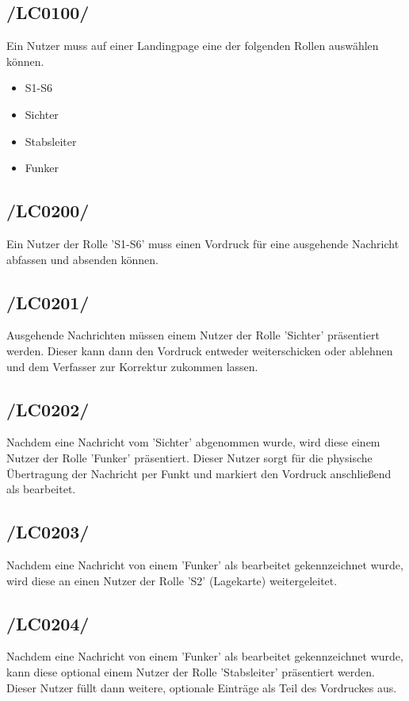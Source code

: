 \subsection{/LC0100/}
Ein Nutzer muss auf einer Landingpage eine der folgenden Rollen auswählen können.
\begin{itemize}
\item S1-S6
\item Sichter
\item Stabsleiter
\item Funker
\end{itemize}

\subsection{/LC0200/}
Ein Nutzer der Rolle 'S1-S6' muss einen Vordruck für eine ausgehende Nachricht abfassen und absenden können.

\subsection{/LC0201/}
Ausgehende Nachrichten müssen einem Nutzer der Rolle 'Sichter' präsentiert werden. Dieser kann dann den Vordruck entweder weiterschicken oder ablehnen und dem Verfasser zur Korrektur zukommen lassen.

\subsection{/LC0202/}
Nachdem eine Nachricht vom 'Sichter' abgenommen wurde, wird diese einem Nutzer der Rolle 'Funker' präsentiert. Dieser Nutzer sorgt für die physische Übertragung der Nachricht per Funkt und markiert den Vordruck anschließend als bearbeitet.

\subsection{/LC0203/}
Nachdem eine Nachricht von einem 'Funker' als bearbeitet gekennzeichnet wurde, wird diese an einen Nutzer der Rolle 'S2' (Lagekarte) weitergeleitet.

\subsection{/LC0204/}
Nachdem eine Nachricht von einem 'Funker' als bearbeitet gekennzeichnet wurde, kann diese optional einem Nutzer der Rolle 'Stabsleiter' präsentiert werden. Dieser Nutzer füllt dann weitere, optionale Einträge als Teil des Vordruckes aus.

